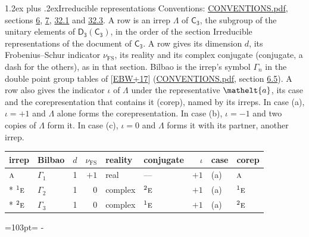 \documentclass[10pt,a4paper]{article}
\makeatletter
\renewcommand\section{\@startsection{section}{1}{\z@}{-3ex plus -1ex minus -.2ex}%
  {1.2ex plus .2ex}{\normalfont\large\sffamily\bfseries\color{parttitle}}}
\newcommand{\needspace}[1]{\par\penalty-100\begingroup\dimen0=#1\relax\dimen2=\pagegoal
  \advance\dimen2-\pagetotal\ifdim\dimen0>\dimen2\relax\ifdim\dimen2>0pt\vfil\break\fi\fi
  \endgroup}
\numberwithin{equation}{section}
\newcommand{\eltfont}[1]{{\let\sigma\eltsigma\mathelt{#1}}}
\newcommand{\grp}[1]{\mathsf{#1}}
\newcommand{\irr}[1]{\text{\normalfont\scshape #1}}
\newcommand{\conjpair}[1]{{}^{#1}}
\newcommand{\elt}[1]{\eltfont{#1}}
\newcommand{\fsind}{\nu_{\mathrm{FS}}}
\makeatother
\begin{document}
\section{Irreducible representations}\label{s:irreps}
Conventions: \href{../../CONVENTIONS.pdf}{CONVENTIONS.pdf}, sections \href{../../../rotation/CONVENTIONS.pdf\#conv.6}{6}, \href{../../../rotation/CONVENTIONS.pdf\#conv.7}{7}, \href{../../CONVENTIONS.pdf\#conv.32.1}{32.1} and \href{../../CONVENTIONS.pdf\#conv.32.3}{32.3}.
\leavevmode\label{n:irrep.Delta}A row is an irrep $\Lambda$ of $\grp{C_{3}}$, the subgroup of the unitary elements of $\grp{D_{3}}(\grp{C_{3}})$, in the order of the section Irreducible representations of the document of \href{../../../rotation/data/pdf/C3.pdf}{$\grp{C_{3}}$}. \label{n:index.dimension}\label{n:index.frobenius}\label{n:head.irrep}\label{n:head.reality}\label{n:head.conjugate}A row gives its dimension $d$, its Frobenius--Schur indicator $\fsind$, its reality and its complex conjugate (conjugate, a dash for the others), as in that section. \label{n:head.bilbao}\label{n:irrep.alias.gamma}Bilbao is the irrep's symbol $\Gamma_n$ in the double point group tables of [\href{../../../REFERENCES.pdf\#ref.EBW+17}{EBW+17}] (\href{../../CONVENTIONS.pdf}{CONVENTIONS.pdf}, section \href{../../../rotation/CONVENTIONS.pdf\#conv.6.5}{6.5}). \label{n:head.case.corep}\label{n:head.corep}A row also gives the indicator $\iota$ of $\Lambda$ under the representative $\elt{a}$, its case and the corepresentation that contains it (corep), named by its irreps. In case (a), $\iota = +1$ and $\Lambda$ alone forms the corepresentation. In case (b), $\iota = -1$ and two copies of $\Lambda$ form it. In case (c), $\iota = 0$ and $\Lambda$ forms it with its partner, another irrep.
\setlength{\emergencystretch}{2em}\par\setlength{\emergencystretch}{0pt}
{\small\renewcommand{\arraystretch}{1.25}\setlength{\tabcolsep}{4pt}\begin{longtable}{@{}llrrllrll@{}}\toprule
irrep & Bilbao & $d$ & $\fsind$ & reality & conjugate & $\iota$ & case & corep\\\midrule\endhead
\bottomrule\endfoot\endlastfoot
$\irr{a}$ & $\Gamma_{1}$ & 1 & $+1$ & real & --- & $+1$ & (a) & $\irr{a}$\\*
$\conjpair{1}\irr{e}$ & $\Gamma_{2}$ & 1 & $0$ & complex & $\conjpair{2}\irr{e}$ & $+1$ & (a) & $\conjpair{1}\irr{e}$\\*
$\conjpair{2}\irr{e}$ & $\Gamma_{3}$ & 1 & $0$ & complex & $\conjpair{1}\irr{e}$ & $+1$ & (a) & $\conjpair{2}\irr{e}$\\
\bottomrule\end{longtable}}
\needspace{103pt}
\end{document}
